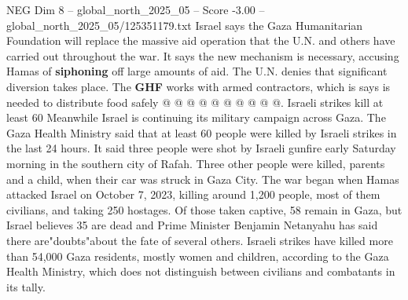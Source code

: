 \begin{textsample}{NEG Dim 8 – global\_north\_2025\_05 – Score -3.00 – global\_north\_2025\_05/125351179.txt}
Israel says the Gaza Humanitarian Foundation will replace the massive aid operation that the U.N. and others have carried out throughout the war.
It says the new mechanism is necessary, accusing Hamas of \textbf{siphoning} off large amounts of aid.
The U.N. denies that significant diversion takes place.
The \textbf{GHF} works with armed contractors, which is says is needed to distribute food safely @ @ @ @ @ @ @ @ @ @.
Israeli strikes kill at least 60 Meanwhile Israel is continuing its military campaign across Gaza.
The Gaza Health Ministry said that at least 60 people were killed by Israeli strikes in the last 24 hours.
It said three people were shot by Israeli gunfire early Saturday morning in the southern city of Rafah.
Three other people were killed, parents and a child, when their car was struck in Gaza City.
The war began when Hamas attacked Israel on October 7, 2023, killing around 1,200 people, most of them civilians, and taking 250 hostages.
Of those taken captive, 58 remain in Gaza, but Israel believes 35 are dead and Prime Minister Benjamin Netanyahu has said there are"doubts"about the fate of several others.
Israeli strikes have killed more than 54,000 Gaza residents, mostly women and children, according to the Gaza Health Ministry, which does not distinguish between civilians and combatants in its tally.

\end{textsample}
